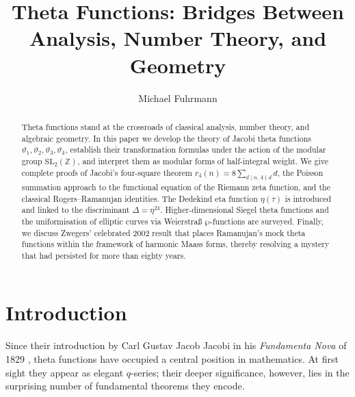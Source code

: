 \documentclass[12pt,a4paper]{amsart}
\author{Michael Fuhrmann}
\theoremstyle{definition}
\begin{document}
\title{Theta Functions: Bridges Between Analysis, Number Theory, and Geometry}

\begin{abstract}
Theta functions stand at the crossroads of classical analysis, number theory, and
algebraic geometry. In this paper we develop the theory of Jacobi theta functions
$\vartheta_1, \vartheta_2, \vartheta_3, \vartheta_4$, establish their transformation
formulas under the action of the modular group $\mathrm{SL}_2(\mathbb{Z})$, and
interpret them as modular forms of half-integral weight. We give complete proofs
of Jacobi's four-square theorem
$r_4(n) = 8\sum_{d \mid n,\, 4 \nmid d} d$,
the Poisson summation approach to the functional equation of the Riemann zeta function,
and the classical Rogers--Ramanujan identities. The Dedekind eta function $\eta(\tau)$
is introduced and linked to the discriminant $\Delta = \eta^{24}$.
Higher-dimensional Siegel theta functions and the uniformisation of elliptic curves
via Weierstra\ss{} $\wp$-functions are surveyed. Finally, we discuss Zwegers'
celebrated 2002 result that places Ramanujan's mock theta functions within the
framework of harmonic Maass forms, thereby resolving a mystery that had persisted
for more than eighty years.
\end{abstract}

\maketitle

\tableofcontents

\section{Introduction}

Since their introduction by Carl Gustav Jacob Jacobi in his
\textit{Fundamenta Nova} of 1829 \cite{Jacobi1829},
theta functions have occupied a central position in mathematics.
At first sight they appear as elegant $q$-series;
their deeper significance, however, lies in the surprising number of
fundamental theorems they encode.
\end{document}
